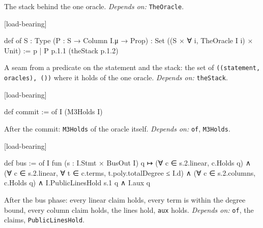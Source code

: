 
The stack behind the one oracle. \emph{Depends on:} \texttt{TheOracle}.

\par\medskip\noindent\textbf{}\hfill\textsf{\small [load-bearing]}\par\nopagebreak

\begin{leancode}
def of {S : Type} (P : S → Column I.μ → Prop) : Set ((S × ∀ i, TheOracle I i) × Unit) :=
  {p | P p.1.1 (theStack p.1.2)}
\end{leancode}


A seam from a predicate on the statement and the stack: the set of \texttt{(\allowbreak{}(\allowbreak{}statement,\allowbreak{} oracles),\allowbreak{} (\allowbreak{}))} where it holds of the one oracle. \emph{Depends on:} \texttt{theStack}.

\par\medskip\noindent\textbf{}\hfill\textsf{\small [load-bearing]}\par\nopagebreak

\begin{leancode}
def commit := of I (M3Holds I)
\end{leancode}


After the commit: \texttt{M3Holds} of the oracle itself. \emph{Depends on:} \texttt{of}, \texttt{M3Holds}.

\par\medskip\noindent\textbf{}\hfill\textsf{\small [load-bearing]}\par\nopagebreak

\begin{leancode}
def bus := of I fun (s : I.Stmt × BusOut I) q ↦ (∀ c ∈ s.2.linear, c.Holds q) ∧
  (∀ c ∈ s.2.linear, ∀ t ∈ c.terms, t.poly.totalDegree ≤ I.d) ∧
  (∀ c ∈ s.2.columns, c.Holds q) ∧ I.PublicLinesHold s.1 q ∧ I.aux q
\end{leancode}


After the bus phase: every linear claim holds, every term is within the degree bound, every column claim holds, the lines hold, \texttt{aux} holds. \emph{Depends on:} \texttt{of}, the claims, \texttt{PublicLinesHold}.

